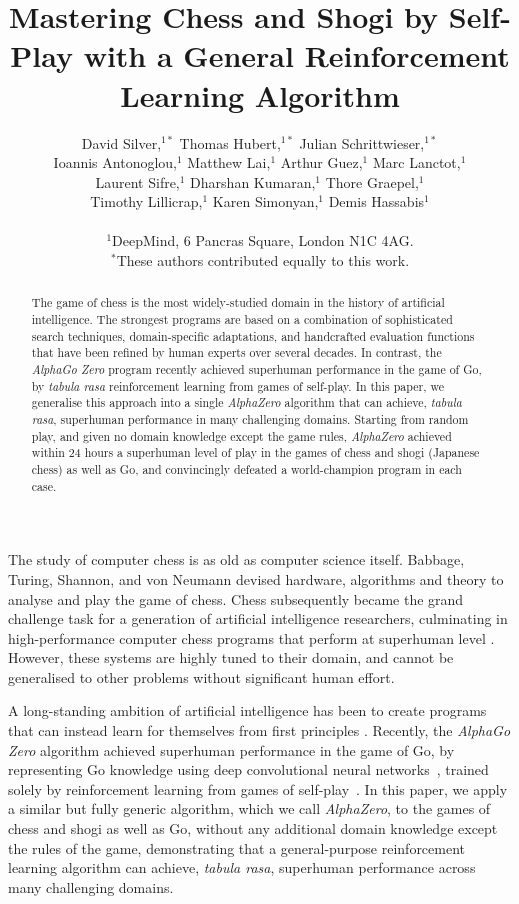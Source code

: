 \documentclass[12pt]{article}
\title{Mastering Chess and Shogi by Self-Play with a General Reinforcement Learning Algorithm}
\date{}
\author
{
David Silver,$^{1\ast}$ 
Thomas Hubert,$^{1\ast}$
Julian Schrittwieser,$^{1\ast}$\\
Ioannis Antonoglou,$^{1}$
Matthew Lai,$^{1}$
Arthur Guez,$^{1}$
Marc Lanctot,$^{1}$\\
Laurent Sifre,$^{1}$
Dharshan Kumaran,$^{1}$
Thore Graepel,$^{1}$\\
Timothy Lillicrap,$^{1}$
Karen Simonyan,$^{1}$
Demis Hassabis$^{1}$
\\
\\
\normalsize{$^{1}$DeepMind, 6 Pancras Square, London N1C 4AG.}
\\
\normalsize{$^\ast$These authors contributed equally to this work.}
}
\begin{document}
\maketitle

\begin{abstract}
The game of chess is the most widely-studied domain in the history of artificial intelligence. The strongest programs are based on a combination of sophisticated search techniques, domain-specific adaptations, and handcrafted evaluation functions
that have been refined by human experts over several decades. In contrast, the \emph{AlphaGo Zero} program recently achieved superhuman performance in the game of Go, by \emph{tabula rasa} reinforcement learning from games of self-play. In this paper, we generalise this approach into a single \emph{AlphaZero} algorithm that  can achieve, \emph{tabula rasa}, superhuman performance in many challenging domains. Starting from random play, and given no domain knowledge except the game rules, \emph{AlphaZero} achieved within 24 hours a superhuman level of play in the games of chess and shogi (Japanese chess) as well as Go, and convincingly defeated a world-champion program in each case. 
\end{abstract}



The study of computer chess is as old as computer science itself. Babbage, Turing, Shannon, and von Neumann devised hardware, algorithms and theory to analyse and play the game of chess. Chess subsequently became the grand challenge task for a generation of artificial intelligence researchers, culminating in high-performance computer chess programs that perform at superhuman level \cite{Campbell02DeepBlue,FengHsiung02DeepBlue}. However, these systems are highly tuned to their domain, and cannot be generalised to other problems without significant human effort. 

A long-standing ambition of artificial intelligence has been to create programs that can instead learn for themselves from first principles \cite{samuel:recent}. Recently, the \emph{AlphaGo Zero} algorithm achieved superhuman performance in the game of Go, by representing Go knowledge using deep convolutional neural networks~\cite{maddison:deepgo,Silver16AG}, trained solely by reinforcement learning from games of self-play~\cite{Silver17AG0}. In this paper, we apply a similar but fully generic algorithm, which we call \emph{AlphaZero}, to the games of chess and shogi as well as Go, without any additional domain knowledge except the rules of the game, demonstrating that a general-purpose reinforcement learning algorithm can achieve, \emph{tabula rasa}, superhuman performance across many challenging domains.
\end{document}
